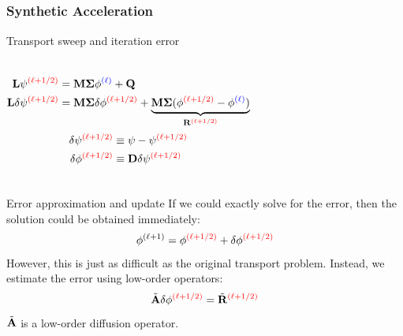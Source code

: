 \documentclass[compress,10pt]{beamer}
\newcommand{\tcr}[1]{\textcolor{red}{#1}}
\newcommand{\tcb}[1]{\textcolor{blue}{#1}}
\begin{document}
\subsection{}
\begin{frame}[t]\frametitle{Synthetic Acceleration}
\begin{block}{Transport sweep and iteration error}{\small
\begin{columns}
\begin{equation*}
\begin{aligned}
{\bf L} \psi^{\tcr{(\ell+1/2)}} &= {\bf M\Sigma} \phi^{\tcb{(\ell)}} +{\bf Q} \\ \vspace{1mm}
{\bf L} \delta \psi^{\tcr{(\ell+1/2)}} &= {\bf M\Sigma} \delta \phi^{\tcr{(\ell+1/2)}} + \underbrace{{\bf M\Sigma} (\phi^{\tcr{(\ell+1/2)}}-\phi^{\tcb{(\ell)}})}_{{\bf R}^{\tcr{(\ell+1/2)}}} 
\end{aligned}
\end{equation*}
\begin{equation*}
\begin{aligned}
\delta \psi^{\tcr{(\ell+1/2)}} &\equiv \psi - \psi^{\tcr{(\ell+1/2)}} \\
\delta \phi^{\tcr{(\ell+1/2)}} &\equiv {\bf D} \delta \psi^{\tcr{(\ell+1/2)}}
\end{aligned}
\end{equation*}
\end{columns}
}
\end{block}
\vspace{-1.5mm}
\begin{block}{Error approximation and update}{\small
If we could exactly solve for the error, then the solution could be obtained immediately:
\begin{equation*}
\phi^{(\ell+1)} = \phi^{\tcr{(\ell+1/2)}} + \delta \phi^{\tcr{(\ell+1/2)}}
\end{equation*}
However, this is just as difficult as the original transport problem. Instead, we estimate the error using low-order operators:
\begin{equation*}
\tilde{{\bf A}} \delta \phi^{\tcr{(\ell+1/2)}} = \tilde{{\bf R}}^{\tcr{(\ell+1/2)}}
\end{equation*}
$\tilde{{\bf A}}$ is a low-order diffusion operator.
}
\end{block}
\end{frame}
\end{document}
